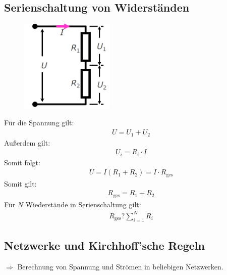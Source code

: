 \documentclass{scrartcl}
\begin{document}
\subsection{Serienschaltung von Widerständen}
\begin{figure}[H]
    \centering
    \includegraphics[width=0.4\textwidth]{serienschaltung.png}
\end{figure}
Für die Spannung gilt:
\begin{align}
    U=U_1+U_2
\end{align}
Außerdem gilt:
\begin{align}
    U_i=R_i\cdot I
\end{align}
Somit folgt:
\begin{align}
    U=I(R_1+R_2)=I\cdot R_\text{ges}
\end{align}
Somit gilt:
\begin{align}
    R_\text{ges}=R_1+R_2
\end{align}
Für $N$ Wiederstände in Serienschaltung gilt:
\begin{align}
    R_\text{ges}?\sum_{i=1}^{N}R_i
\end{align}

\subsection{Netzwerke und Kirchhoff'sche Regeln}
$\Rightarrow$ Berechnung von Spannung und Strömen in beliebigen Netzwerken.
\end{document}
